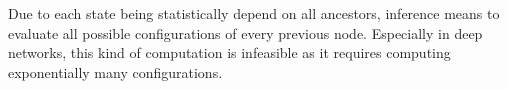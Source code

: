 Due to each state being statistically depend on all ancestors, inference means to evaluate all possible configurations of every previous node.
Especially in deep networks, this kind of computation is infeasible as it requires computing exponentially many configurations.\\





%





\newpage

